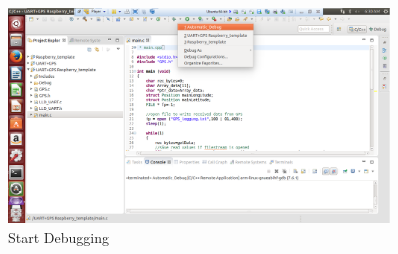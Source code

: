 \begin{figure}[H]
	\centering\includegraphics[width=0.9\textwidth]{fig/Dev_Concept/Debug8}
	\caption{Start Debugging}
	\label{fig:Debug8}
\end{figure}


%







